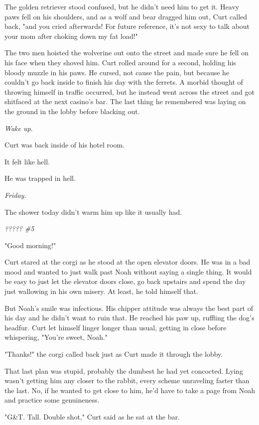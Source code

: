 The golden retriever stood confused, but he didn't need him to get it. Heavy paws fell on his shoulders, and as a wolf and bear dragged him out, Curt called back, "and you cried afterwards! For future reference, it's not sexy to talk about your mom after choking down my fat load!"

The two men hoisted the wolverine out onto the street and made sure he fell on his face when they shoved him. Curt rolled around for a second, holding his bloody muzzle in his paws. He cursed, not cause the pain, but because he couldn't go back inside to finish his day with the ferrets. A morbid thought of throwing himself in traffic occurred, but he instead went across the street and got shitfaced at the next casino's bar. The last thing he remembered was laying on the ground in the lobby before blacking out.

\emph{Wake up}.

Curt was back inside of his hotel room.

It felt like hell.

He was trapped in hell.

\emph{Friday.}

The shower today didn't warm him up like it usually had.

\emph{????? \#5}

"Good morning!"

Curt stared at the corgi as he stood at the open elevator doors. He was in a bad mood and wanted to just walk past Noah without saying a single thing. It would be easy to just let the elevator doors close, go back upstairs and spend the day just wallowing in his own misery. At least, he told himself that.

But Noah's smile was infectious. His chipper attitude was always the best part of his day and he didn't want to ruin that. He reached his paw up, ruffling the dog's headfur. Curt let himself linger longer than usual, getting in close before whispering, "You're sweet, Noah."

"Thanks!" the corgi called back just as Curt made it through the lobby.

That last plan was stupid, probably the dumbest he had yet concocted. Lying wasn't getting him any closer to the rabbit, every scheme unraveling faster than the last. No, if he wanted to get close to him, he'd have to take a page from Noah and practice some genuineness.

"G\&T. Tall. Double shot," Curt said as he sat at the bar.

